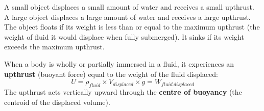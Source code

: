 A small object displaces a small amount of water
and receives a small upthrust. A large object
displaces a large amount of water and receives
a large upthrust. The object floats if its weight
is less than or equal to the maximum upthrust
(the weight of fluid it would displace when fully
submerged). It sinks if its weight exceeds the
maximum upthrust.

\begin{lawbox}
When a body is wholly or partially immersed in a
fluid, it experiences an \textbf{upthrust} (buoyant
force) equal to the weight of the fluid displaced:
\[
  U = \rho_{fluid} \times V_{displaced} \times g
  = W_{fluid\ displaced}
\]
The upthrust acts vertically upward through the
\textbf{centre of buoyancy} (the centroid of the
displaced volume).
\end{lawbox}

